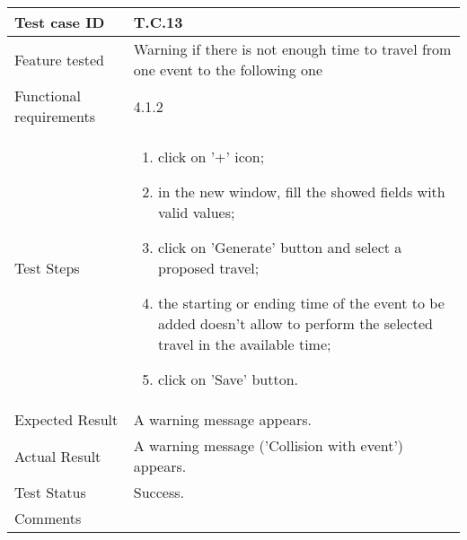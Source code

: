 \begin{table}[H]
	\begin{center}
		\begin{tabular}{ | p{} | p{} | }
		\hline
		Test case ID & T.C.13\\
		\hline
		Feature tested & Warning if there is not enough time to travel from one event to the following one\\
		\hline
		Functional requirements & 4.1.2 \\
    	\hline
		Test Steps & 
			\begin{enumerate}
				\item click on '+' icon;
				\item in the new window, fill the showed fields with valid values;
				\item click on 'Generate' button and select a proposed travel;
				\item the starting or ending time of the event to be added doesn't allow to perform the selected travel in the available time;
				\item click on 'Save' button.
			\end{enumerate} \\
		\hline
		Expected Result & A warning message appears.\\
		\hline
		Actual Result & A warning message ('Collision with event') appears.\\ 
		\hline
		Test Status & \color{ForestGreen}Success.\\ 
		\hline
		Comments & \\ 
		\hline
		
		\end{tabular}
	\end{center}
\end{table}

